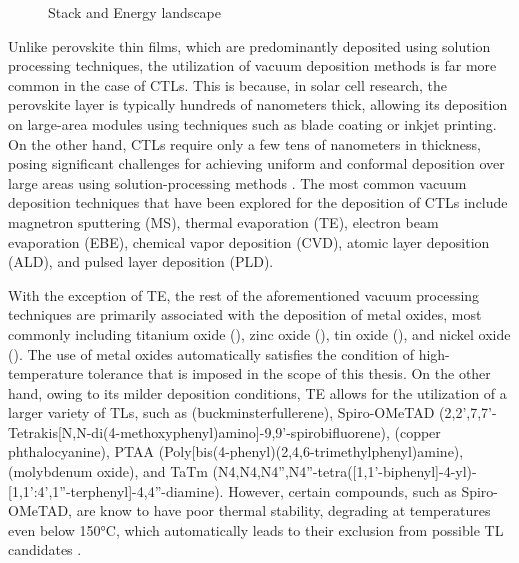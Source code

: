 \begin{figure}[htbp]
    \caption{Stack and Energy landscape}
    \label{fig:ch2:stack_and_energy_landscape}
\end{figure}

Unlike perovskite thin films, which are predominantly deposited using solution processing techniques, the utilization of vacuum deposition methods is far more common in the case of CTLs. This is because, in solar cell research, the perovskite layer is typically hundreds of nanometers thick, allowing its deposition on large-area modules using techniques such as blade coating or inkjet printing. On the other hand, CTLs require only a few tens of nanometers in thickness, posing significant challenges for achieving uniform and conformal deposition over large areas using solution-processing methods \cite{Luo2025VacuumModules}. The most common vacuum deposition techniques that have been explored for the deposition of CTLs include magnetron sputtering (MS), thermal evaporation (TE), electron beam evaporation (EBE), chemical vapor deposition (CVD), atomic layer deposition (ALD), and pulsed layer deposition (PLD).

With the exception of TE, the rest of the aforementioned vacuum processing techniques are primarily associated with the deposition of metal oxides, most commonly including titanium oxide (), zinc oxide (), tin oxide (), and nickel oxide (). The use of metal oxides automatically satisfies the condition of high-temperature tolerance that is imposed in the scope of this thesis. On the other hand, owing to its milder deposition conditions, TE allows for the utilization of a larger variety of TLs, such as  (buckminsterfullerene), Spiro-OMeTAD (2,2',7,7'-Tetrakis[N,N-di(4-methoxyphenyl)amino]-9,9'-spirobifluorene),  (copper phthalocyanine), PTAA (Poly[bis(4-phenyl)(2,4,6-trimethylphenyl)amine),  (molybdenum oxide), and TaTm (N4,N4,N4'',N4''-tetra([1,1'-biphenyl]-4-yl)-[1,1':4',1''-terphenyl]-4,4''-diamine). However, certain compounds, such as Spiro-OMeTAD, are know to have poor thermal stability, degrading at temperatures even below 150°C, which automatically leads to their exclusion from possible TL candidates \cite{Zhao2017EffectCells, Tumen-Ulzii2020UnderstandingTemperature, Jeong2022ChallengesCells}. 


